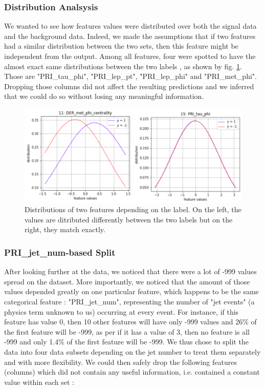 \documentclass[10pt,conference,compsocconf]{IEEEtran}
\begin{document}
\subsubsection{Distribution Analsysis}
We wanted to see how features values were distributed over both the signal data and the background data. Indeed, we made the assumptions that if two features had a similar distribution between the two sets, then this feature might be independent from the output. Among all features, four were spotted to have the almost exact same distributions between the two labels , as shown by fig. \ref{fig:distrib}. Those are "PRI\_tau\_phi", "PRI\_lep\_pt", "PRI\_lep\_phi" and "PRI\_met\_phi". Dropping those columns did not affect the resulting predictions and we inferred that we could do so without losing any meaningful information.
\begin{figure}[tbp]
  \centering
  \includegraphics[width=1.0\columnwidth]{distrib}
 \caption{Distributions of two features depending on the label. On the left, the values are ditributed differently between the two labels but on the right, they match exactly. }
  \vspace{-3mm}
  \label{fig:distrib}
\end{figure}

\subsubsection{PRI\_jet\_num-based Split}
After looking further at the data, we noticed that there were a lot of -999 values spread on the dataset. More importantly, we noticed that the amount of those values depended greatly on one particular feature, which happens to be the same categorical feature : "PRI\_jet\_num", representing the number of "jet events" (a physics term unknown to us) occurring at every event. For instance, if this feature has value 0, then 10 other features will have only -999 values and 26\% of the first feature will be -999, as per if it has a value of 3, then no feature is all -999 and only 1.4\% of the first feature will be -999.
We thus chose to split the data into four data subsets depending on the jet number to treat them separately and with more flexibility. We could then safely drop the following features (columns) which did not contain any useful information, i.e. contained a constant value within each set :
\end{document}
